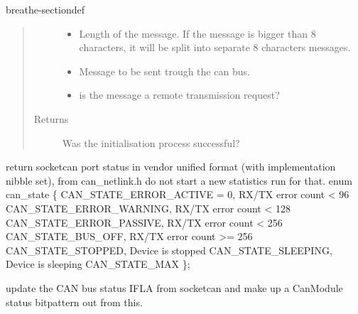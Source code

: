 \documentclass[a4paper,10pt,english]{sphinxmanual}
\begin{document}
\begin{fulllineitems}
\begin{sphinxuseclass}{breathe-sectiondef}
\begin{fulllineitems}
\begin{quote}
\begin{description}
\begin{itemize}
\item {} 
\sphinxAtStartPar
{} \textendash{} Length of the message. If the message is bigger than 8 characters, it will be split into separate 8 characters messages. 

\item {} 
\sphinxAtStartPar
{} \textendash{} Message to be sent trough the can bus. 

\item {} 
\sphinxAtStartPar
{} \textendash{} is the message a remote transmission request? 

\end{itemize}

\item[{Returns}] \leavevmode
\sphinxAtStartPar
Was the initialisation process successful?

\end{description}\end{quote}

\end{fulllineitems}


\begin{fulllineitems}
\label{\detokenize{classesdetails:_CPPv4N12CSockCanScan13getPortStatusEv}}%
\pysigstartmultiline
{}%
\pysigstopmultiline
\sphinxAtStartPar
return socketcan port status in vendor unified format (with implementation nibble set), from can\_netlink.h do not start a new statistics run for that. enum can\_state \{ CAN\_STATE\_ERROR\_ACTIVE = 0, RX/TX error count \textless{} 96 CAN\_STATE\_ERROR\_WARNING, RX/TX error count \textless{} 128 CAN\_STATE\_ERROR\_PASSIVE, RX/TX error count \textless{} 256 CAN\_STATE\_BUS\_OFF, RX/TX error count \textgreater{}= 256 CAN\_STATE\_STOPPED, Device is stopped CAN\_STATE\_SLEEPING, Device is sleeping CAN\_STATE\_MAX \};

\sphinxAtStartPar
update the CAN bus status IFLA from socketcan and make up a CanModule status bitpattern out from this.


\end{fulllineitems}
\end{sphinxuseclass}
\end{fulllineitems}
\end{document}
